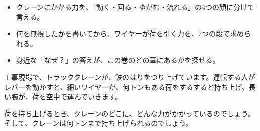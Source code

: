 \newcommand\pxatalk[4]{%
  \bkChar{#2}{(7,#1-6.5)}{12mm}
  \node[rectangle callout, callout absolute pointer={(15.5,#1)}, anchor=west, draw=bkTheme!80!black, line width=0.8pt,
    fill=white, rounded corners=2.5mm, inner xsep=3mm, inner ysep=1.8mm, text width=103mm, align=left,
    font=\small] at (21,#1) {#4};
  \node[anchor=north, font=\sffamily\footnotesize, text=bkGray, inner sep=0pt] at (7,#1-7.5) {#3};}
\makeatother


\begin{goal}
\begin{itemize}[label={\color{bkTheme}●}, leftmargin=1.6\zw, itemsep=0pt, topsep=1pt]
\item {}\enspace クレーンにかかる力を、「動く・回る・ゆがむ・流れる」の4つの顔に分けて言える。
\item {}\enspace 何を無視したかを書いてから、ワイヤーが荷を引く力を、7つの段で求められる。
\item {}\enspace 身近な「なぜ？」の答えが、この巻のどの章にあるかを探せる。
\end{itemize}
\end{goal}

\begin{hatena}
\noindent\begin{minipage}[c]{0.5\linewidth}
工事現場で、トラッククレーンが、鉄のはりをつり上げています。運転する人がレバーを動かすと、細いワイヤーが、何トンもある荷をするすると持ち上げ、長い腕が、荷を空中で運んでいきます。\par\vspace{3pt}
荷を持ち上げるとき、クレーンのどこに、どんな力がかかっているのでしょう。そして、クレーンは何トンまで持ち上げられるのでしょう。
\end{minipage}\hfill
\begin{minipage}[c]{0.46\linewidth}\centering
{}
\end{minipage}
\end{hatena}

